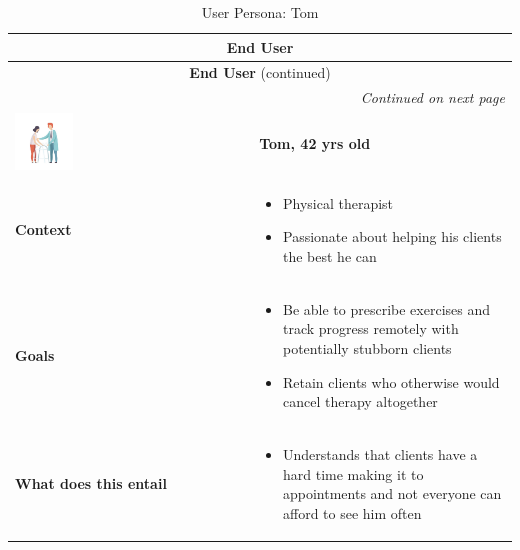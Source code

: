 \documentclass{article}
\begin{document}
\begin{longtable}{|p{}|p{}|}
    \caption{User Persona: Tom} \label{table:user_persona_tom} \\
    \hline
    \multicolumn{2}{|c|}{\textbf{End User}} \\ 
    \hline
    \endfirsthead

    \hline
    \multicolumn{2}{|c|}{\textbf{End User} (continued)} \\ 
    \hline
    \endhead

    \hline
    \multicolumn{2}{|r|}{\textit{Continued on next page}} \\ 
    \hline
    \endfoot

    \hline
    \endlastfoot

    \includegraphics[width=0.25\textwidth]{tom.jpeg} & \textbf{Tom, 42 yrs old} \\ 
    \hline
    \textbf{Context} &
    \begin{itemize}[leftmargin=*]
        \item Physical therapist 
        \item Passionate about helping his clients the best he can
    \end{itemize} \\
    \hline
    \textbf{Goals} &
    \begin{itemize}[leftmargin=*]
        \item Be able to prescribe exercises and track progress remotely with potentially stubborn clients
        \item Retain clients who otherwise would cancel therapy altogether
    \end{itemize} \\
    \hline
    \textbf{What does this entail} &
    \begin{itemize}[leftmargin=*]
        \item Understands that clients have a hard time making it to appointments and not everyone can afford to see him often
    \end{itemize} \\
    \hline
\end{longtable}
\end{document}
